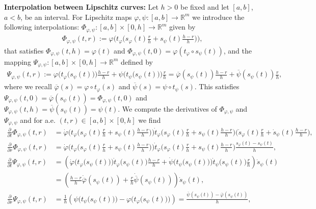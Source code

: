 \documentclass[a4paper,11pt]{article}
\numberwithin{equation}{section}
\newcommand{\R}{\mathbb{R}}
\begin{document}
\textbf{Interpolation between Lipschitz curves:} Let $h>0$ be fixed and let $[a,b]$, $a<b$, be an interval. 
For Lipschitz maps $\varphi,\psi:[a,b]\rightarrow \R^m$ we introduce the following interpolations: $\Phi_{\varphi,\psi}:[a,b]\times [0,h]\rightarrow \R^m$  given by
\begin{align}\label{Phi_interp}
\Phi_{\varphi,\psi}(t,r):=\varphi\Big(t_\varphi\big(s_\varphi(t)\frac{r}{h}+s_\psi(t)\frac{h-r}{h} \big)\Big),
\end{align}
that satisfies $\Phi_{\varphi,\psi}(t,h)=\varphi(t)$ and $\Phi_{\varphi,\psi}(t,0)=\varphi(t_\varphi\circ s_\psi(t))$,  
and the mapping $\Psi_{\varphi,\psi}:[a,b]\times [0,h]\rightarrow \R^m$ defined by
\begin{align}\label{Psi_interp}
	\Psi_{\varphi,\psi}(t,r):=\varphi\Big(t_\varphi\big(s_\psi(t)\big)\Big)\frac{h-r}{h}+\psi\Big(t_\psi\big(s_\psi(t)\big)\Big)\frac{r}{h}=\overline \varphi(s_\psi(t))\frac{h-r}{h}+\overline \psi(s_\psi(t))\frac{r}{h},
\end{align}
where we recall $\overline \varphi(s)=\varphi\circ t_\varphi(s)$ and $\overline \psi(s)=\psi\circ t_\psi(s)$. This satisfies $\Psi_{\varphi,\psi}(t,0)=\overline \varphi(s_\psi(t))=\Phi_{\varphi,\psi}(t,0)$ and $\Psi_{\varphi,\psi}(t,h)=\overline \psi(s_\psi(t))=\psi(t)$.
We compute the derivatives of $\Phi_{\varphi,\psi}$ and $\Psi_{\varphi,\psi}$ and for a.e. $(t,r)\in [a,b]\times [0,h]$ we find
\begin{align*}
	\frac{\partial }{\partial t}\Phi_{\varphi,\psi}(t,r)&=\dot \varphi\Big(t_\varphi\big(s_\varphi(t)\frac{r}{h}+s_\psi(t)\frac{h-r}{h} \big)\Big)\dot t_\varphi\big(s_\varphi(t)\frac{r}{h}+s_\psi(t)\frac{h-r}{h} \big)\big(\dot s_\varphi(t)\frac{r}{h}+\dot s_\psi(t)\frac{h-r}{h}\big),\\
		\frac{\partial }{\partial r}\Phi_{\varphi,\psi}(t,r)&=\dot \varphi\Big(t_\varphi\big(s_\varphi(t)\frac{r}{h}+s_\psi(t)\frac{h-r}{h} \big)\Big)\dot t_\varphi\big(s_\varphi(t)\frac{r}{h}+s_\psi(t)\frac{h-r}{h} \big)\frac{s_\varphi(t)-s_\psi(t)}{h},\\
		\frac{\partial }{\partial t}\Psi_{\varphi,\psi}(t,r)&=\left(\dot \varphi\Big(t_\varphi\big(s_\psi(t)\big)\Big)\dot t_\varphi\big(s_\psi(t)\big)\frac{h-r}{h}+\dot \psi\Big(t_\psi\big(s_\psi(t)\big)\Big)\dot t_\psi\big(s_\psi(t)\big)\frac{r}{h}\right)\dot s_\psi(t)\\
		&=\left(\frac{h-r}{h}\dot{\overline \varphi}(s_\psi(t))+\frac{r}{h}\dot{\overline \psi}(s_\psi(t))\right)\dot s_\psi(t),\\
		\frac{\partial }{\partial r}\Psi_{\varphi,\psi}(t,r)&=\frac1h\left(\psi\Big(t_\psi\big(s_\psi(t)\big)\Big)-\varphi\Big(t_\varphi\big(s_\psi(t)\big)\Big)\right)=\frac{{\overline \psi}(s_\psi(t))-{\overline \varphi}(s_\psi(t))}{h},
\end{align*}
\end{document}
